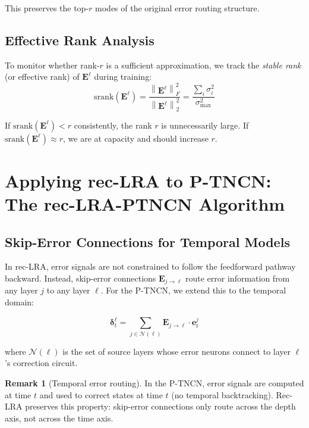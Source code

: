 \documentclass[11pt]{article}
\theoremstyle{definition}
\newtheorem{remark}{Remark}[section]
\newcommand{\ve}{\mathbf{e}}
\newcommand{\E}{\mathbf{E}}
\newcommand{\norm}[1]{\left\|#1\right\|}
\begin{document}
This preserves the top-$r$ modes of the original error routing structure.

\subsection{Effective Rank Analysis}

To monitor whether rank-$r$ is a sufficient approximation, we track the
\emph{stable rank} (or effective rank) of $\E^\ell$ during training:
\begin{equation}
  \text{srank}(\E^\ell) = \frac{\norm{\E^\ell}^2_F}{\norm{\E^\ell}^2_2}
  = \frac{\sum_i \sigma_i^2}{\sigma_{\max}^2}
\end{equation}

If $\text{srank}(\E^\ell) < r$ consistently, the rank $r$ is unnecessarily large.
If $\text{srank}(\E^\ell) \approx r$, we are at capacity and should increase $r$.

\section{Applying rec-LRA to P-TNCN: The rec-LRA-PTNCN Algorithm}

\subsection{Skip-Error Connections for Temporal Models}

In rec-LRA, error signals are not constrained to follow the feedforward
pathway backward. Instead, skip-error connections $\E_{j \to \ell}$ route
error information from any layer $j$ to any layer $\ell$. For the P-TNCN,
we extend this to the temporal domain:

\begin{equation}
  \label{eq:reclra_ptncn}
  \bm{\delta}^\ell_t = \sum_{j \in \mathcal{N}(\ell)} \E_{j \to \ell} \cdot \ve^j_t
\end{equation}

where $\mathcal{N}(\ell)$ is the set of source layers whose error neurons
connect to layer $\ell$'s correction circuit.

\begin{remark}[Temporal error routing]
In the P-TNCN, error signals are computed at time $t$ and used to correct
states at time $t$ (no temporal backtracking). Rec-LRA preserves this property:
skip-error connections only route across the depth axis, not across the time axis.
\end{remark}
\end{document}
